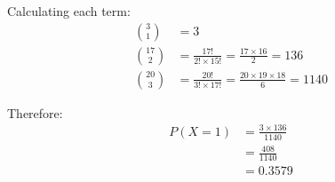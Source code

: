 \documentclass{article}
\begin{document}
Calculating each term:
\begin{align}
\binom{3}{1} &= 3\\
\binom{17}{2} &= \frac{17!}{2! \times 15!} = \frac{17 \times 16}{2} = 136\\
\binom{20}{3} &= \frac{20!}{3! \times 17!} = \frac{20 \times 19 \times 18}{6} = 1140
\end{align}

Therefore:
\begin{align}
P(X = 1) &= \frac{3 \times 136}{1140}\\
&= \frac{408}{1140}\\
&= 0.3579
\end{align}

\end{document}
